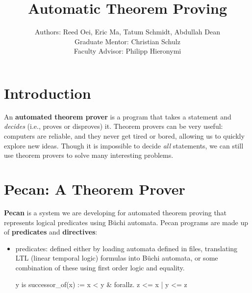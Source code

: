 \documentclass[landscape,usenames,dvipsnames]{sciposter}
\title{Automatic Theorem Proving}
\author{
Authors: Reed Oei, Eric Ma, Tatum Schmidt, Abdullah Dean \\
Graduate Mentor: Christian Schulz \\
Faculty Advisor: Philipp Hieronymi \\
}
\begin{document}

\maketitle
\vspace{-3ex}
\begin{multicols}{3}  %



\section*{Introduction}

An \textbf{automated theorem prover} is a program that takes a statement and \emph{decides} (i.e., proves or disproves) it. 
Theorem provers can be very useful: computers are reliable, and they never get tired or bored, allowing us to quickly explore new ideas.
Though it is impossible to decide \emph{all} statements, we can still use theorem provers to solve many interesting problems. 

\section*{Pecan: A Theorem Prover}

\textbf{Pecan} is a system we are developing for automated theorem proving that represents logical predicates using B\"uchi automata.
Pecan programs are made up of \textbf{predicates} and \textbf{directives}:

\begin{itemize}
    \item predicates: defined either by loading automata defined in files, translating LTL (linear temporal logic) formulas into B\"uchi automata, or some combination of these using first order logic and equality.

\begin{pecan}
y is successor_of(x) := x < y & forallz. z <= x | y <= z
\end{pecan}


\end{itemize}
\end{multicols}
\end{document}
